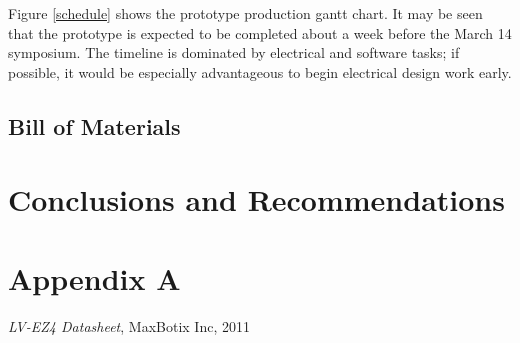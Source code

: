 \documentclass[oneside,final]{report}
\begin{document}
Figure \ref{schedule} shows the prototype production gantt chart.  It may be seen that the prototype is expected to be completed about a week before the March 14 symposium.  The timeline is dominated by electrical and software tasks; if possible, it would be especially advantageous to begin electrical design work early.

\section{Bill of Materials}


\chapter{Conclusions and Recommendations}

\chapter*{Appendix A}

\begin{thebibliography}{9}


   \emph{LV-EZ4 Datasheet}, MaxBotix Inc, 2011

\end{thebibliography}
\end{document}
